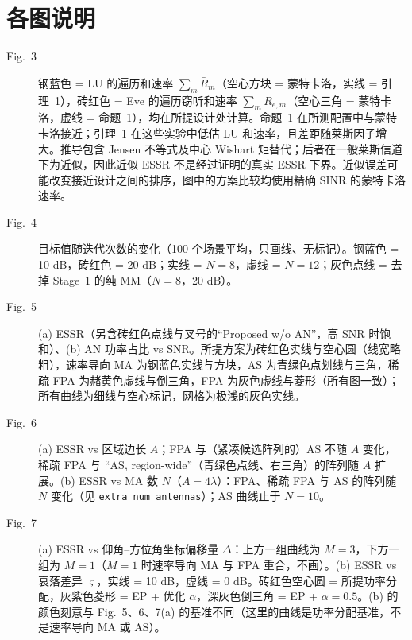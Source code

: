\documentclass[11pt,a4paper]{ctexart}
\newcommand{\code}[1]{\texttt{#1}}
\begin{document}
\section{各图说明}
\begin{description}
\item[Fig.~3] 钢蓝色 = LU 的遍历和速率 $\sum_m\bar R_m$（空心方块 = 蒙特卡洛，实线 = 引理~1），砖红色 = Eve 的遍历窃听和速率 $\sum_m\bar R_{e,m}$（空心三角 = 蒙特卡洛，虚线 = 命题~1），均在所提设计处计算。命题~1 在所测配置中与蒙特卡洛接近；引理~1 在这些实验中低估 LU 和速率，且差距随莱斯因子增大。推导包含 Jensen 不等式及中心 Wishart 矩替代；后者在一般莱斯信道下为近似，因此近似 ESSR 不是经过证明的真实 ESSR 下界。近似误差可能改变接近设计之间的排序，图中的方案比较均使用精确 SINR 的蒙特卡洛速率。
\item[Fig.~4] 目标值随迭代次数的变化（100 个场景平均，只画线、无标记）。钢蓝色 = 10 dB，砖红色 = 20 dB；实线 = $N=8$，虚线 = $N=12$；灰色点线 = 去掉 Stage~1 的纯 MM（$N=8$，20 dB）。
\item[Fig.~5] (a) ESSR（另含砖红色点线与叉号的“Proposed w/o AN”，高 SNR 时饱和）、(b) AN 功率占比 vs SNR。所提方案为砖红色实线与空心圆（线宽略粗），速率导向 MA 为钢蓝色实线与方块，AS 为青绿色点划线与三角，稀疏 FPA 为赭黄色虚线与倒三角，FPA 为灰色虚线与菱形（所有图一致）；所有曲线为细线与空心标记，网格为极浅的灰色实线。
\item[Fig.~6] (a) ESSR vs 区域边长 $A$；FPA 与（紧凑候选阵列的）AS 不随 $A$ 变化，稀疏 FPA 与 “AS, region-wide”（青绿色点线、右三角）的阵列随 $A$ 扩展。(b) ESSR vs MA 数 $N$（$A=4\lambda$）：FPA、稀疏 FPA 与 AS 的阵列随 $N$ 变化（见 \code{extra\_num\_antennas}）；AS 曲线止于 $N=10$。
\item[Fig.~7] (a) ESSR vs 仰角--方位角坐标偏移量 $\Delta$：上方一组曲线为 $M=3$，下方一组为 $M=1$（$M=1$ 时速率导向 MA 与 FPA 重合，不画）。(b) ESSR vs 衰落差异 $\varsigma$，实线 = 10 dB，虚线 = 0 dB。砖红色空心圆 = 所提功率分配，灰紫色菱形 = EP + 优化 $\alpha$，深灰色倒三角 = EP + $\alpha=0.5$。(b) 的颜色刻意与 Fig.~5、6、7(a) 的基准不同（这里的曲线是功率分配基准，不是速率导向 MA 或 AS）。
\end{description}

\end{document}
